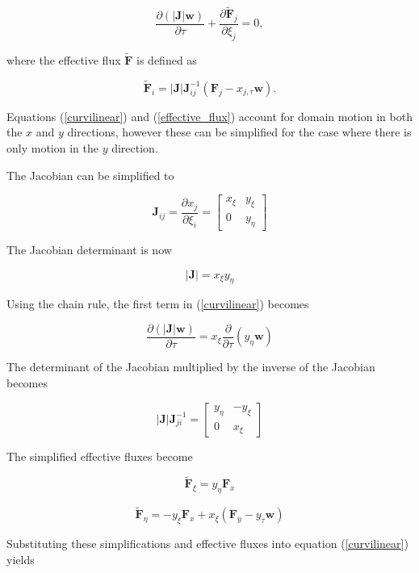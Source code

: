 \documentclass[10pt]{article}
\begin{document}
	\begin{equation} \label{curvilinear}
		\frac{\partial (|\mathbf{J}| \mathbf{w})}{\partial \tau} + \frac{\partial \tilde{\mathbf{F}}_j}{\partial \xi_j} = 0,
	\end{equation}
	
	where the effective flux $\tilde{\mathbf{F}}$ is defined as
	
	\begin{equation} \label{effective_flux}
		\tilde{\mathbf{F}}_i = |\mathbf{J}| \mathbf{J}_{ij}^{-1} (\mathbf{F}_j - x_{j,\tau} \mathbf{w}).
	\end{equation}
		
	 Equations (\ref{curvilinear}) and (\ref{effective_flux}) account for domain motion in both the $x$ and $y$ directions, however these can be simplified for the case where there is only motion in the $y$ direction.
	 
	 The Jacobian can be simplified to
	 
	 $$
	 \mathbf{\mathbf{J}}_{ij} = \frac{\partial x_j}{\partial \xi_i} = 
	 \begin{bmatrix}
	 	x_\xi & y_\xi \\
	 	0 & y_\eta
	 \end{bmatrix}
	$$
	
	The Jacobian determinant is now
	
	$$
	|\mathbf{J}| = x_\xi y_\eta
	$$
	 
	 Using the chain rule, the  first term in (\ref{curvilinear}) becomes
	 
	 $$
	 \frac{\partial (|\mathbf{J}| \mathbf{w})}{\partial \tau} = x_\xi \frac{\partial}{\partial \tau} \left( y_\eta \mathbf{w} \right)
	 $$
	 
	 The determinant of the Jacobian multiplied by the inverse of the Jacobian becomes
	 
	 $$
	 |\mathbf{J}| \mathbf{J}_{ji}^{-1} = 
	 \begin{bmatrix}
	 	y_\eta & -y_\xi \\
	 	0 & x_\xi
	 \end{bmatrix}
	 $$
	 
	 The simplified effective fluxes become
	 
	 $$ \tilde{\mathbf{F}}_\xi = y_\eta \mathbf{F}_x$$
	 
	 $$ \tilde{\mathbf{F}}_\eta = -y_\xi \mathbf{F}_x + x_\xi (\mathbf{F}_y - y_\tau \mathbf{w})$$
	 
	 Substituting these simplifications and effective fluxes into equation (\ref{curvilinear}) yields
	 
\end{document}
